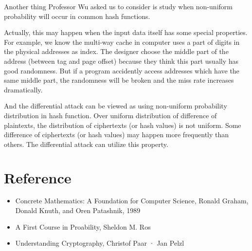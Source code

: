 \documentclass{article}
\begin{document}
\begin{spacing}{1.1}
    Another thing Professor Wu asked us to consider is study when non-uniform probability will occur in common hash functions.

    Actually, this may happen when the input data itself has some special properties. For example, we know the multi-way cache in computer uses a part of digits in the physical addresses as index. The designer choose the middle part of the address (between tag and page offset) because they think this part usually has good randomness. But if a program accidently access addresses which have the same middle part, the randomness will be broken and the miss rate increases dramatically.

    And the differential attack can be viewed as using non-uniform probability distribution in hash function. Over uniform distribution of difference of plaintexts, the distribution of ciphertexts (or hash values) is not uniform. Some difference of ciphertexts (or hash values) may happen more frequently than others. The differential attack can utilize this property.
    \section*{Reference}
    \begin{itemize}
        \item Concrete Mathematics: A Foundation for Computer Science, Ronald Graham, Donald Knuth, and Oren Patashnik, 1989
        \item A First Course in Proability, Sheldon M. Ros
        \item Understanding Cryptography, Christof Paar · Jan Pelzl
    \end{itemize}


    \end{spacing}
    
\end{document}
